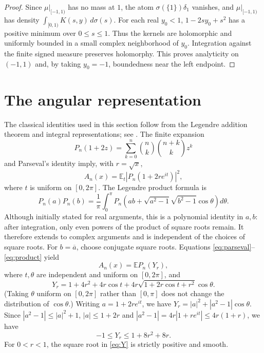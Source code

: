 \documentclass[11pt]{article}
\newcommand{\E}{\mathbb E}
\begin{document}
\begin{proof}
Since $\mu|_{[-1,1)}$ has no mass at $1$, the atom
$\sigma(\{1\})\delta_1$ vanishes, and $\mu|_{[-1,1)}$ has density
$\int_{[0,1)}K(s,y)\,d\sigma(s)$.
For each real $y_0<1$, $1-2sy_0+s^2$ has a positive minimum over
$0\le s\le1$. Thus the kernels are holomorphic and uniformly bounded in a
small complex neighborhood of $y_0$. Integration against the finite signed
measure preserves holomorphy. This proves analyticity on $(-1,1)$ and,
by taking $y_0=-1$, boundedness near the left endpoint.
\end{proof}

\section{The angular representation}\label{sec:average}
The classical identities used in this section follow from the Legendre
addition theorem and integral representations; see \cite{DLMF}.
The finite expansion
\[
 P_n(1+2z)=\sum_{k=0}^n\binom nk\binom{n+k}k z^k
\]
and Parseval's identity imply, with $r=\sqrt{x}$,
\begin{equation}\label{eq:parseval}
 A_n(x)=\E_t\left|P_n(1+2r e^{it})\right|^2,
\end{equation}
where $t$ is uniform on $[0,2\pi]$.
The Legendre product formula is
\begin{equation}\label{eq:product}
 P_n(a)P_n(b)=\frac1\pi\int_0^\pi
 P_n\left(ab+\sqrt{a^2-1}\sqrt{b^2-1}\cos\theta\right)d\theta.
\end{equation}
Although initially stated for real arguments, this is a polynomial identity
in $a,b$: after integration, only even powers of the product of square roots
remain. It therefore extends to complex arguments and is independent of the
choices of square roots. For $b=\overline a$, choose conjugate square roots.
Equations \eqref{eq:parseval}--\eqref{eq:product} yield
\begin{equation}\label{eq:average}
 A_n(x)=\E P_n(Y_r),
\end{equation}
where $t,\theta$ are independent and uniform on $[0,2\pi]$, and
\begin{equation}\label{eq:Y}
 Y_r=1+4r^2+4r\cos t
       +4r\sqrt{1+2r\cos t+r^2}\cos\theta.
\end{equation}
(Taking $\theta$ uniform on $[0,2\pi]$ rather than $[0,\pi]$ does not
change the distribution of $\cos\theta$.)
Writing $a=1+2r e^{it}$, we have
$Y_r=|a|^2+|a^2-1|\cos\theta$. Since $|a^2-1|\le|a|^2+1$,
$|a|\le1+2r$ and $|a^2-1|=4r|1+re^{it}|\le4r(1+r)$, we have
\begin{equation}\label{eq:range}
 -1\le Y_r\le1+8r^2+8r.
\end{equation}
For $0<r<1$, the square root in \eqref{eq:Y} is strictly positive and smooth.
\end{document}
